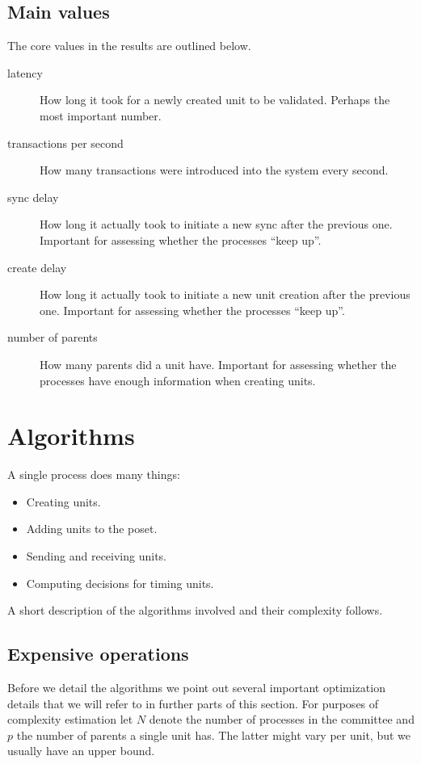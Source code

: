 \documentclass[a4paper,10pt]{article}
\begin{document}
		\subsection{Main values}
			The core values in the results are outlined below.
			\begin{description}
				\item[latency] How long it took for a newly created unit to be validated. Perhaps the most important number.
				\item[transactions per second] How many transactions were introduced into the system every second.
				\item[sync delay] How long it actually took to initiate a new sync after the previous one. Important for assessing whether the processes ``keep up''.
				\item[create delay] How long it actually took to initiate a new unit creation after the previous one. Important for assessing whether the processes ``keep up''.
				\item[number of parents] How many parents did a unit have. Important for assessing whether the processes have enough information when creating units.
			\end{description}
	\section{Algorithms}
		A single process does many things:
		\begin{itemize}
			\item Creating units.
			\item Adding units to the poset.
			\item Sending and receiving units.
			\item Computing decisions for timing units.
		\end{itemize}
		A short description of the algorithms involved and their complexity follows.
		\subsection{Expensive operations}
		 Before we detail the algorithms we point out several important optimization details that we will refer to in further parts of this section.
			For purposes of complexity estimation let $N$ denote the number of processes in the committee and $p$ the number of parents a single unit has.
			The latter might vary per unit, but we usually have an upper bound.
\end{document}

